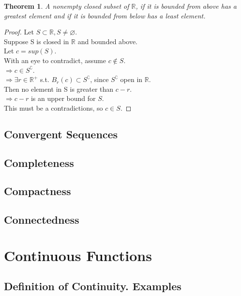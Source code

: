 \documentclass{article}
\newtheorem{theorem}{Theorem}[section]
\begin{document}
			\begin{theorem}
				A nonempty closed subset of $\mathbb{R}$, if it is bounded from above has a greatest element
				and if it is bounded from below has a least element.
			\end{theorem}
			\begin{proof}
				Let $S \subset \mathbb{R}, S \neq \varnothing$. \\
				Suppose S is closed in $\mathbb{R}$ and bounded above. \\
				Let $c = sup(S)$. \\
				With an eye to contradict, assume $c \notin S$. \\
				$\Rightarrow c \in S^\complement$. \\
				$\Rightarrow \exists r \in \mathbb{R}^+$ s.t. $B_r(c) \subset S^\complement$, since $S^\complement$ open in $\mathbb{R}$. \\
				Then no element in S is greater than $c - r$. \\
				$\Rightarrow c - r$ is an upper bound for $S$. \\
				This must be a contradictions, so $c \in S$.
			\end{proof}

		\subsection{Convergent Sequences}
		
		\subsection{Completeness}
		
		\subsection{Compactness}
		
		\subsection{Connectedness}
	
	\section{Continuous Functions}
		\subsection{Definition of Continuity. Examples}
		
\end{document}

